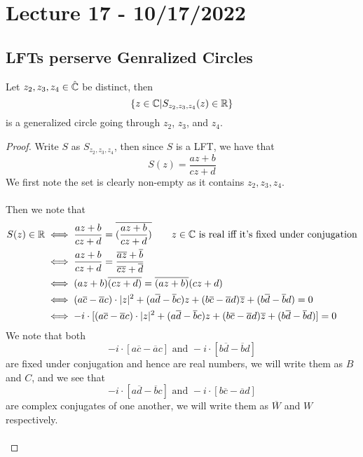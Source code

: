 \section{Lecture 17 - 10/17/2022}
\subsection{LFTs perserve Genralized Circles}

\begin{theorem}
    Let $z_2, z_3, z_4 \in \hat{\mathbb{C}}$ be distinct, then
    \[\{z \in \mathbb{C} | S_{z_2, z_3, z_4}(z) \in \mathbb{R}\}\]
    is a generalized circle going through $z_2$, $z_3$, and $z_4$.
\end{theorem}

\begin{proof}
    Write $S$ as $S_{z_2, z_3, z_4}$, then since $S$ is a LFT, we have that
    \[S(z) = \frac{az + b}{cz + d}\]
    We first note the set is clearly non-empty as it contains $z_2, z_3, z_4$.\\\\
    Then we note that
    \begin{align*}
        S(z) \in \Rbb &\iff \frac{az + b}{cz + d} = \overline{(\frac{az + b}{cz + d})} \tag*{$z \in \Cbb$ is real iff it's fixed under conjugation}\\
        &\iff \frac{az + b}{cz + d} = \frac{\overline{a}\overline{z} + \overline{b}}{\overline{c}\overline{z} + \overline{d}}\\
        &\iff (az + b)\overline{(cz + d)} = \overline{(az + b)}(cz + d)\\
        &\iff (a\overline{c} - \overline{a}c) \cdot |z|^2 + (a\overline{d} -\overline{b}c)z + (b\overline{c} - \overline{a}d)\overline{z} + (b\overline{d} - \overline{b}d) = 0\\
        &\iff -i\cdot [(a\overline{c} - \overline{a}c) \cdot |z|^2 + (a\overline{d} -\overline{b}c)z + (b\overline{c} - \overline{a}d)\overline{z} + (b\overline{d} - \overline{b}d)] = 0
    \end{align*}
    We note that both
    \[ -i\cdot [a\overline{c} - \overline{a}c] \text{ and } -i\cdot [b\overline{d} - \overline{b}d]\]
    are fixed under conjugation and hence are real numbers, we will write them as $B$ and $C$, and we see that
    \[-i \cdot [a\overline{d} -\overline{b}c] \text{ and } -i \cdot [b\overline{c} - \overline{a}d]\]
    are complex conjugates of one another, we will write them as $\overline{W}$ and $W$ respectively.\\\\

\end{proof}
